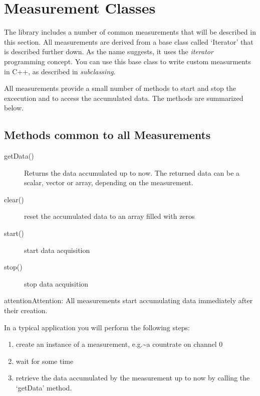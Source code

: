 \documentclass[letterpaper,10pt,english]{sphinxmanual}
\begin{document}
\section{Measurement Classes}
\label{sections/api:measurement-classes}
The library includes a number of common measurements that will be described in this section.
All measurements are derived from a base class called `Iterator' that is described further down.
As the name suggests, it uses the \emph{iterator} programming concept.
You can use this base class to write custom measurments in C++, as described in \emph{subclassing}.

All measurements provide a small number of methods to start and stop the excecution
and to access the accumulated data. The methods are summarized below.


\subsection{Methods common to all Measurements}
\label{sections/api:methods-common-to-all-measurements}\begin{description}
\item[{getData()}] \leavevmode
Returns the data accumulated up to now. The returned data can be a scalar, vector or array,
depending on the measurement.

\item[{clear()}] \leavevmode
reset the accumulated data to an array filled with zeros

\item[{start()}] \leavevmode
start data acquisition

\item[{stop()}] \leavevmode
stop data acquisition

\end{description}

\begin{notice}{attention}{Attention:}
All measurements start accumulating data immediately after their creation.
\end{notice}

In a typical application you will perform the following steps:
\begin{enumerate}
\item {} 
create an instance of a measurement, e.g.\textasciitilde{}a countrate on channel 0

\item {} 
wait for some time

\item {} 
retrieve the data accumulated by the measurement up to now by calling the `getData' method.

\end{enumerate}
\end{document}
